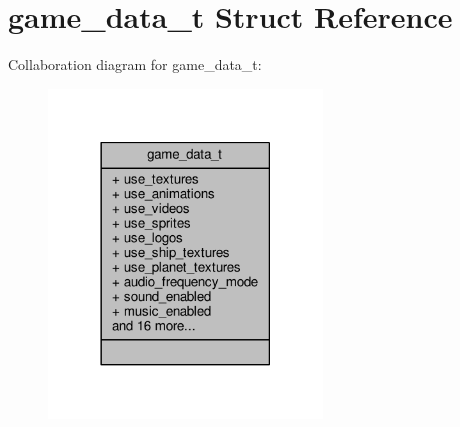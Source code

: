 \hypertarget{structgame__data__t}{}\section{game\+\_\+data\+\_\+t Struct Reference}
\label{structgame__data__t}


Collaboration diagram for game\+\_\+data\+\_\+t\+:
\nopagebreak
\begin{figure}[H]
\begin{center}
\leavevmode
\includegraphics[width=206pt]{d5/d40/structgame__data__t__coll__graph}
\end{center}
\end{figure}
